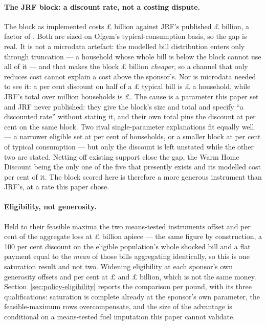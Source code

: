 \paragraph{The JRF block: a discount rate, not a costing dispute.} The block as implemented costs \pounds \genJrfGapModelledBn{} billion against JRF's published \pounds \genJrfGapSponsorBn{} billion, a factor of \genJrfGapRatio{}. Both are sized on Ofgem's typical-consumption basis, so the gap is real. It is not a microdata artefact: the modelled bill distribution enters only through truncation --- a household whose whole bill is below the block cannot use all of it --- and that makes the block \pounds \genJrfBlockTruncationBn{} billion \emph{cheaper}, so a channel that only reduces cost cannot explain a cost above the sponsor's. Nor is microdata needed to see it: a \genJrfModelledDiscountPct{} per cent discount on half of a \pounds \genJrfOfgemTypicalGbp{} typical bill is \pounds \genJrfMechanicalPerHouseholdGbp{} a household, while JRF's total over \genJrfHouseholdsM{} million households is \pounds \genJrfSponsorPerHouseholdGbp{}. The cause is a parameter this paper set and JRF never published: they give the block's size and total and specify ``a discounted rate'' without stating it, and their own total pins the discount at \genJrfImpliedDiscountPct{} per cent on the same block. Two rival single-parameter explanations fit equally well --- a narrower eligible set at \genJrfImpliedEligibleSharePct{} per cent of households, or a smaller block at \genJrfImpliedBlockSharePct{} per cent of typical consumption --- but only the discount is left unstated while the other two are stated. Netting off existing support \genJrfNettingClosesGap{} close the gap, the Warm Home Discount being the only one of the five that presently exists and its modelled cost \genJrfNettingShareOfGapPct{} per cent of it. The block scored here is therefore a more generous instrument than JRF's, at a rate this paper chose.

\paragraph{Eligibility, not generosity.} Held to their feasible maxima the two means-tested instruments offset \genSocialTariffCappedOffsetPct{} and \genWhdCappedOffsetPct{} per cent of the aggregate loss at \pounds \genSocialTariffCappedCostBn{} billion apiece --- the same figure by construction, a 100 per cent discount on the eligible population's whole shocked bill and a flat payment equal to the \emph{mean} of those bills aggregating identically, so this is one saturation result and not two. Widening eligibility at each sponsor's own generosity offsets \genSocialTariffEligibilityOffsetPct{} and \genWhdEligibilityOffsetPct{} per cent at \pounds \genSocialTariffEligibilityCostBn{} and \pounds \genWhdEligibilityCostBn{} billion, which is not the same money. Section~\ref{sec:policy-eligibility} reports the comparison per pound, with its three qualifications: saturation is complete already at the sponsor's own parameter, the feasible-maximum rows overcompensate, and the size of the advantage is conditional on a means-tested fuel imputation this paper cannot validate.

